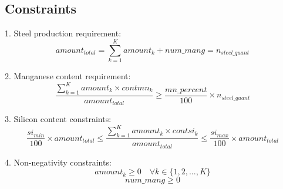 \documentclass{article}
\begin{document}
\subsection*{Constraints}
1. Steel production requirement:
\[
amount_{total} = \sum_{k=1}^{K} amount_k + num\_mang = n_{steel\_quant}
\]

2. Manganese content requirement:
\[
\frac{\sum_{k=1}^{K} amount_k \times contmn_k}{amount_{total}} \geq \frac{mn\_percent}{100} \times n_{steel\_quant}
\]

3. Silicon content constraints:
\[
\frac{si_{min}}{100} \times amount_{total} \leq \frac{\sum_{k=1}^{K} amount_k \times contsi_k}{amount_{total}} \leq \frac{si_{max}}{100} \times amount_{total}
\]

4. Non-negativity constraints:
\[
amount_k \geq 0 \quad \forall k \in \{1, 2, ..., K\}
\]
\[
num\_mang \geq 0
\]
\end{document}
